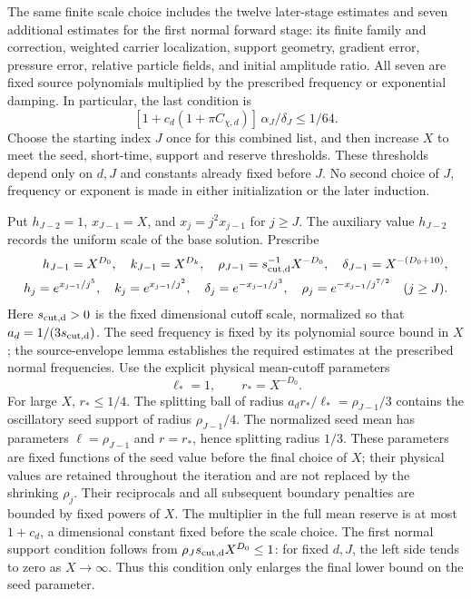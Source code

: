 \documentclass[11pt]{article}
\theoremstyle{definition}
\begin{document}
The same finite scale choice includes the twelve later-stage estimates and
seven additional estimates for the first normal forward stage: its finite
family and correction, weighted carrier localization, support geometry,
gradient error, pressure error, relative particle fields, and initial
amplitude ratio. All seven are fixed source polynomials multiplied by
the prescribed frequency or exponential damping. In particular, the last
condition is
\[
 [1+c_d(1+\pi C_{\chi,d})]\,\alpha_J/\delta_J\leq1/64.
\]
Choose the starting index $J$ once for this combined list, and then
increase $X$ to meet the seed, short-time, support and reserve
thresholds. These thresholds depend only on $d,J$ and constants already
fixed before $J$. No second choice of $J$, frequency or exponent is made
in either initialization or the later induction.

Put $h_{J-2}=1$, $x_{J-1}=X$, and $x_j=j^2x_{j-1}$ for $j\geq J$.
The auxiliary value $h_{J-2}$ records the uniform scale of the base
solution. Prescribe
\begin{align}
 h_{J-1}=X^{D_0},\quad k_{J-1}=X^{D_k},\quad
 \rho_{J-1}=s_{\rm cut,d}^{-1}X^{-D_0},\quad \delta_{J-1}=X^{-(D_0+10)},
 \label{eq:seed-scales}\\
 h_j=e^{x_{j-1}/j^5},\quad k_j=e^{x_{j-1}/j^2},\quad
 \delta_j=e^{-x_{j-1}/j^3},\quad
 \rho_j=e^{-x_{j-1}/j^{7/2}}\quad(j\geq J).
 \label{eq:normal-scales}
\end{align}
Here $s_{\rm cut,d}>0$ is the fixed dimensional cutoff scale, normalized so that
$a_d=1/(3s_{\rm cut,d})$. The seed frequency is fixed by its polynomial source
bound in $X$; the source-envelope lemma establishes the required estimates at the prescribed normal
frequencies. Use the explicit physical mean-cutoff parameters
\[
 \ell_*=1,\qquad r_*=X^{-D_0}.
\]
For large $X$, $r_*\leq1/4$. The splitting ball of radius
$a_dr_*/\ell_* = \rho_{J-1}/3$ contains the oscillatory seed support
of radius $\rho_{J-1}/4$. The normalized seed mean has parameters
$\ell=\rho_{J-1}$ and $r=r_*$, hence splitting radius $1/3$.
These parameters are fixed functions of the seed value before the final
choice of $X$; their physical values are retained throughout the
iteration and are not replaced by the shrinking $\rho_j$.
Their reciprocals and all subsequent boundary penalties are bounded by
fixed powers of $X$. The multiplier in the full mean reserve is at most
$1+c_d$, a dimensional constant fixed before the scale choice.
The first normal support condition follows from
$\rho_Js_{\rm cut,d}X^{D_0}\leq1$: for fixed $d,J$, the left side tends to zero
as $X\to\infty$. Thus this condition only enlarges the final lower bound on the seed parameter.
\end{document}
